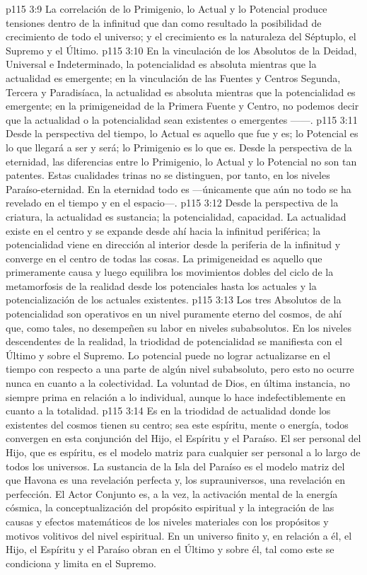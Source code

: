 \vs p115 3:9 \pc La correlación de lo Primigenio, lo Actual y lo Potencial produce tensiones dentro de la infinitud que dan como resultado la posibilidad de crecimiento de todo el universo; y el crecimiento es la naturaleza del Séptuplo, el Supremo y el Último.
\vs p115 3:10 En la vinculación de los Absolutos de la Deidad, Universal e Indeterminado, la potencialidad es absoluta mientras que la actualidad es emergente; en la vinculación de las Fuentes y Centros Segunda, Tercera y Paradisíaca, la actualidad es absoluta mientras que la potencialidad es emergente; en la primigeneidad de la Primera Fuente y Centro, no podemos decir que la actualidad o la potencialidad sean existentes o emergentes ------.
\vs p115 3:11 Desde la perspectiva del tiempo, lo Actual es aquello que fue y es; lo Potencial es lo que llegará a ser y será; lo Primigenio es lo que es. Desde la perspectiva de la eternidad, las diferencias entre lo Primigenio, lo Actual y lo Potencial no son tan patentes. Estas cualidades trinas no se distinguen, por tanto, en los niveles Paraíso\hyp{}eternidad. En la eternidad todo es ---únicamente que aún no todo se ha revelado en el tiempo y en el espacio---.
\vs p115 3:12 Desde la perspectiva de la criatura, la actualidad es sustancia; la potencialidad, capacidad. La actualidad existe en el centro y se expande desde ahí hacia la infinitud periférica; la potencialidad viene en dirección al interior desde la periferia de la infinitud y converge en el centro de todas las cosas. La primigeneidad es aquello que primeramente causa y luego equilibra los movimientos dobles del ciclo de la metamorfosis de la realidad desde los potenciales hasta los actuales y la potencialización de los actuales existentes.
\vs p115 3:13 Los tres Absolutos de la potencialidad son operativos en un nivel puramente eterno del cosmos, de ahí que, como tales, no desempeñen su labor en niveles subabsolutos. En los niveles descendentes de la realidad, la triodidad de potencialidad se manifiesta con el Último y sobre el Supremo. Lo potencial puede no lograr actualizarse en el tiempo con respecto a una parte de algún nivel subabsoluto, pero esto no ocurre nunca en cuanto a la colectividad. La voluntad de Dios, en última instancia, no siempre prima en relación a lo individual, aunque lo hace indefectiblemente en cuanto a la totalidad.
\vs p115 3:14 Es en la triodidad de actualidad donde los existentes del cosmos tienen su centro; sea este espíritu, mente o energía, todos convergen en esta conjunción del Hijo, el Espíritu y el Paraíso. El ser personal del Hijo, que es espíritu, es el modelo matriz para cualquier ser personal a lo largo de todos los universos. La sustancia de la Isla del Paraíso es el modelo matriz del que Havona es una revelación perfecta y, los suprauniversos, una revelación en perfección. El Actor Conjunto es, a la vez, la activación mental de la energía cósmica, la conceptualización del propósito espiritual y la integración de las causas y efectos matemáticos de los niveles materiales con los propósitos y motivos volitivos del nivel espiritual. En un universo finito y, en relación a él, el Hijo, el Espíritu y el Paraíso obran en el Último y sobre él, tal como este se condiciona y limita en el Supremo.
